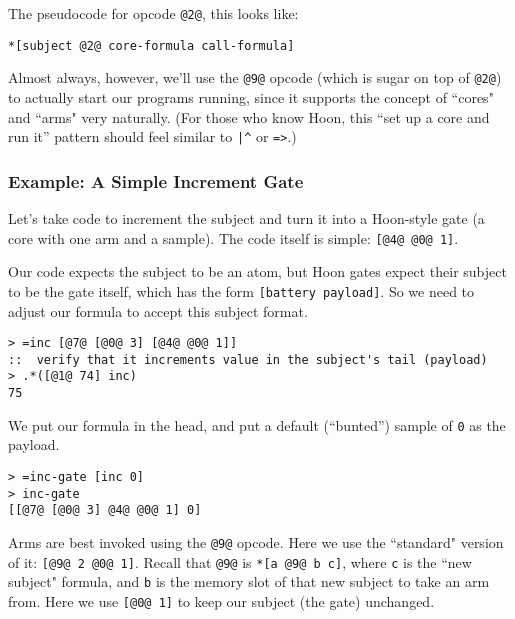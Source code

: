 \documentclass[twoside]{article}
\begin{document}
The pseudocode for opcode \lstinline[style=inlinecode]{@2@}, this looks like:

\begin{lstlisting}[style=listingcode]
*[subject @2@ core-formula call-formula]
\end{lstlisting}

Almost always, however, we'll use the \lstinline[style=inlinecode]{@9@} opcode (which is sugar on top of \lstinline[style=inlinecode]{@2@}) to actually start our programs running, since it supports the concept of ``cores" and ``arms" very naturally.  (For those who know Hoon, this “set up a core and run it” pattern should feel similar to \lstinline[style=inlinecode]{|^} or \lstinline[style=inlinecode]{=>}.)

\subsubsection{Example:  A Simple Increment Gate}

Let's take code to increment the subject and turn it into a Hoon-style gate (a core with one arm and a sample). The code itself is simple: \lstinline[style=inlinecode]{[@4@ @0@ 1]}.

Our code expects the subject to be an atom, but Hoon gates expect their subject to be the gate itself, which has the form \lstinline[style=inlinecode]{[battery payload]}. So we need to adjust our formula to accept this subject format.

\begin{lstlisting}[style=listingcode]
> =inc [@7@ [@0@ 3] [@4@ @0@ 1]]
::  verify that it increments value in the subject's tail (payload)
> .*([@1@ 74] inc)
75
\end{lstlisting}

We put our formula in the head, and put a default (``bunted'') sample of \lstinline[style=inlinecode]{0} as the payload.

\begin{lstlisting}[style=listingcode]
> =inc-gate [inc 0]
> inc-gate
[[@7@ [@0@ 3] @4@ @0@ 1] 0]
\end{lstlisting}

Arms are best invoked using the \lstinline[style=inlinecode]{@9@} opcode. Here we use the ``standard" version of it: \lstinline[style=inlinecode]{[@9@ 2 @0@ 1]}. Recall that \lstinline[style=inlinecode]{@9@} is \lstinline[style=inlinecode]{*[a @9@ b c]}, where \lstinline[style=inlinecode]{c} is the ``new subject" formula, and \lstinline[style=inlinecode]{b} is the memory slot of that new subject to take an arm from. Here we use \lstinline[style=inlinecode]{[@0@ 1]} to keep our subject (the gate) unchanged.
\end{document}
